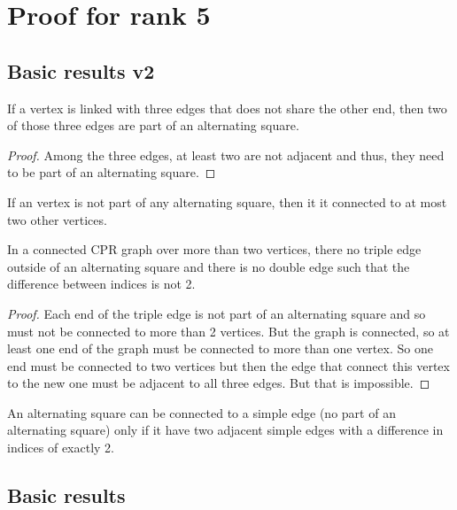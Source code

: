 \section{Proof for rank 5}

\subsection{Basic results v2}

\begin{proposition}
  If a vertex is linked with three edges that does not share the other end, then two of those three edges are part of an alternating square.
\end{proposition}

\begin{proof}
  Among the three edges, at least two are not adjacent and thus, they need to be part of an alternating square.
\end{proof}

\begin{corollary}
  If an vertex is not part of any alternating square, then it it connected to at most two other vertices.
\end{corollary}

\begin{proposition}
  In a connected CPR graph over more than two vertices, there no triple edge outside of an alternating square and there is no double edge such that the difference between indices is not 2.
\end{proposition}

\begin{proof}
  Each end of the triple edge is not part of an alternating square and so must not be connected to more than 2 vertices. But the graph is connected, so at least one end of the graph must be connected to more than one vertex. So one end must be connected to two vertices but then the edge that connect this vertex to the new one must be adjacent to all three edges. But that is impossible.
\end{proof}

\begin{proposition}
  An alternating square can be connected to a simple edge (no part of an alternating square) only if it have two adjacent simple edges with a difference in indices of exactly 2.
\end{proposition}



\subsection{Basic results}

